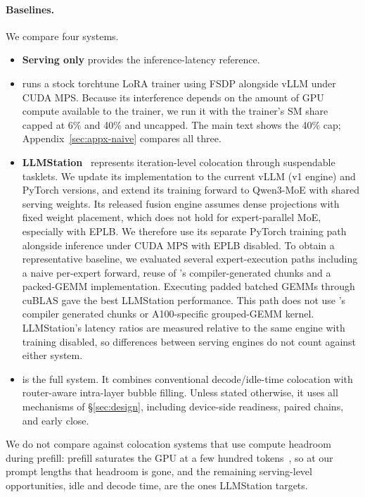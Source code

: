\paragraph{Baselines.} We compare four systems.
\begin{itemize}
  \item \textbf{Serving only} provides the inference-latency reference.

  \item \textbf{\Uncoord} runs a stock torchtune LoRA trainer
  using FSDP alongside vLLM under CUDA MPS. Because its interference
  depends on the amount of GPU compute available to the trainer, we
  run it with the trainer's SM share capped at 6\% and 40\% and
  uncapped. The main text shows the 40\% cap;
  Appendix~\ref{sec:appx-naive} compares all three.

  \item \textbf{LLMStation}~\cite{llmstation} represents iteration-level colocation through suspendable tasklets. We update its implementation to the current vLLM (v1 engine) and PyTorch versions, and extend its training forward to Qwen3-MoE with shared serving weights. Its released fusion engine assumes dense projections with fixed weight placement, which does not hold for expert-parallel \ac{MoE}, especially with EPLB. We therefore use its separate PyTorch training path alongside inference under CUDA MPS with EPLB disabled. To obtain a representative baseline, we evaluated several expert-execution paths including a naive per-expert forward, reuse of \sys{}'s compiler-generated chunks and a packed-GEMM implementation. Executing padded batched GEMMs through cuBLAS gave the best LLMStation performance. This path does not use \sys{}'s compiler generated chunks or A100-specific grouped-GEMM kernel. LLMStation's latency ratios are measured relative to the same engine with training disabled, so differences between serving engines do not count against either system.

  \item \textbf{\sys{}} is the full system. It combines conventional
  decode/idle-time colocation with router-aware intra-layer bubble
  filling. Unless stated otherwise, it uses all mechanisms of
  \S\ref{sec:design}, including device-side readiness, paired chains,
  and early close.
\end{itemize}

We do not compare against colocation systems that use compute headroom
during prefill: prefill saturates the GPU at a few hundred
tokens~\cite{sarathi}, so at our prompt lengths that headroom is gone,
and the remaining serving-level opportunities, idle and decode time, are
the ones LLMStation targets.

